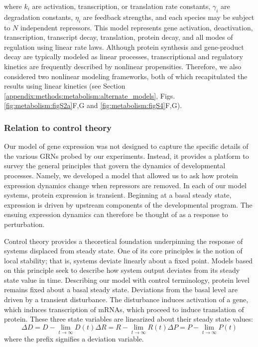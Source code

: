 where $k_i$ are activation, transcription, or translation rate constants, $\gamma_i$ are degradation constants, $\eta_i$ are feedback strengths, and each species may be subject to $N$ independent repressors. This model represents gene activation, deactivation, transcription, transcript decay, translation, protein decay, and all modes of regulation using linear rate laws. Although protein synthesis and gene-product decay are typically modeled as linear processes, transcriptional and regulatory kinetics are frequently described by nonlinear propensities. Therefore, we also considered two nonlinear modeling frameworks, both of which recapitulated the results using linear kinetics (see Section \ref{appendix:methods:metabolism:alternate_models}, Figs. \ref{fig:metabolism:figS2a}F,G and \ref{fig:metabolism:figS4}F,G).

\subsubsection{Relation to control theory}
\label{appendix:methods:metabolism:controls}

Our model of gene expression was not designed to capture the specific details of the various GRNs probed by our experiments. Instead, it provides a platform to survey the general principles that govern the dynamics of developmental processes. Namely, we developed a model that allowed us to ask how protein expression dynamics change when repressors are removed. In each of our model systems, protein expression is transient. Beginning at a basal steady state, expression is driven by upstream components of the developmental program. The ensuing expression dynamics can therefore be thought of as a response to perturbation. 

Control theory provides a theoretical foundation underpinning the response of systems displaced from steady state. One of its core principles is the notion of local stability; that is, systems deviate linearly about a fixed point. Models based on this principle seek to describe how system output deviates from its steady state value in time. Describing our model with control terminology, protein level remains fixed about a basal steady state. Deviations from the basal level are driven by a transient disturbance. The disturbance induces activation of a gene, which induces transcription of mRNAs, which proceed to induce translation of protein. These three state variables are linearized about their steady state values:
\begin{equation}
\label{appendix:methods:metabolism:eq:deviations}
\Delta D = D - \lim_{t \to \infty} D(t)
\Delta R = R - \lim_{t \to \infty} R(t)
\Delta P = P - \lim_{t \to \infty} P(t)
\end{equation}
where the prefix \Delta signifies a deviation variable. 

